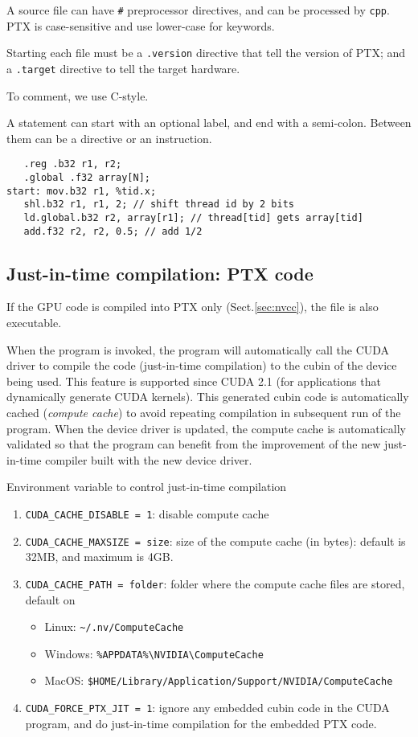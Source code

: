 A source file can have \verb!#! preprocessor directives, and can be
processed by \verb!cpp!. PTX is case-sensitive and use lower-case for
keywords. 

Starting each file must be a \verb!.version! directive that tell the
version of PTX; and a \verb!.target! directive to tell the target
hardware. 


To comment, we use C-style.


A statement can start with an optional label, and end with a
semi-colon. Between them can be a directive or an instruction.
\begin{lstlisting}
   .reg .b32 r1, r2;
   .global .f32 array[N];
start: mov.b32 r1, %tid.x;
   shl.b32 r1, r1, 2; // shift thread id by 2 bits
   ld.global.b32 r2, array[r1]; // thread[tid] gets array[tid]
   add.f32 r2, r2, 0.5; // add 1/2
\end{lstlisting}


\subsection{Just-in-time compilation: PTX code}
\label{sec:just-in-time_compile}

If the GPU code is compiled into PTX only (Sect.\ref{sec:nvcc}), the file is
also executable.

When the program is invoked, the program will automatically call the CUDA driver
to compile the code (just-in-time compilation) to the cubin of the device being
used. This feature is supported since CUDA 2.1 (for applications that
dynamically generate CUDA kernels). This generated cubin code is automatically
cached ({\it compute cache}) to avoid repeating compilation in subsequent run of
the program. When the device driver is updated, the compute cache is
automatically validated so that the program can benefit from the improvement of
the new just-in-time compiler built with the new device driver.

\begin{framed}
Environment variable to control just-in-time compilation
\begin{enumerate}
  \item \verb!CUDA_CACHE_DISABLE = 1!: disable compute cache
  \item \verb!CUDA_CACHE_MAXSIZE = size!: size of the compute cache (in bytes):
  default is 32MB, and maximum is 4GB.
  \item \verb!CUDA_CACHE_PATH = folder!: folder where the compute cache files
  are stored, default on
  \begin{itemize}
    \item Linux: \verb!~/.nv/ComputeCache!
    \item Windows: \verb!%APPDATA%\NVIDIA\ComputeCache!
    \item MacOS: \verb!$HOME/Library/Application/Support/NVIDIA/ComputeCache!
  \end{itemize}
  \item \verb!CUDA_FORCE_PTX_JIT = 1!: ignore any embedded cubin code in the
  CUDA program, and do just-in-time compilation for the embedded PTX code.
\end{enumerate}
\end{framed}


